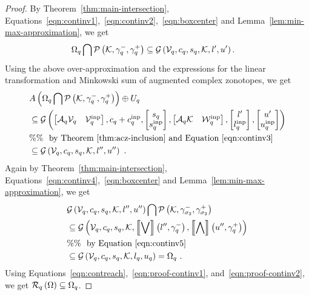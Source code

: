 \begin{proof}
By Theorem~\ref{thm:main-intersection},
Equations~\ref{eqn:continv1},~\ref{eqn:continv2},~\ref{eqn:boxcenter}
and Lemma~\ref{lem:min-max-approximation}, we get
%
\begin{align*}
& \Omega_q\bigcap{\mathcal{P}\left(\mathcal{K},\gamma_q^-,\gamma_q^+\right)}
  \subseteq \mathcal{G}\left(\mathcal{V}_q,c_q,s_q,\mathcal{K},l^\prime,u^\prime\right).
\end{align*}
%
Using the above over-approximation and the expressions for the linear
transformation and Minkowski sum of augmented complex zonotopes, we
get
%
\begin{align}
& A\left(\Omega_q\bigcap{\mathcal{P}\left(\mathcal{K},\gamma_q^-,\gamma_q^+\right)}\right)\oplus U_q\nonumber\\
& \subseteq \mathcal{G}\left(
\left[\begin{matrix}\mathcal{A}_q\mathcal{V}_q & \mathcal{V}^{\operatorname{inp}}_q\end{matrix}\right]
,
c_q+c^{\operatorname{inp}}_q
,
\left[\begin{matrix}s_q\\ s^{\operatorname{inp}}_q\end{matrix}\right]
,
\left[\begin{matrix}\mathcal{A}_q\mathcal{K} & \mathcal{W}^{\operatorname{inp}}_q\end{matrix}\right]
,
\left[\begin{matrix}l^\prime\\l^{\operatorname{inp}}_q\end{matrix}\right]
,
\left[\begin{matrix}u^\prime\\ u^{\operatorname{inp}}_q\end{matrix}\right]
\right)\nonumber\\
& \%\%~~\text{by Theorem~\ref{thm:acz-inclusion} and Equation~\ref{eqn:continv3}}\nonumber\\
& \subseteq \mathcal{G}\left(\mathcal{V}_q,c_q,s_q,\mathcal{K},l^{\prime\prime},u^{\prime\prime}\right)~\label{eqn:proof-continv1}.
\end{align}
%
Again by Theorem~\ref{thm:main-intersection},
Equations~\ref{eqn:continv4},~\ref{eqn:boxcenter}
and Lemma~\ref{lem:min-max-approximation}, we
get
%
\begin{align}
& \mathcal{G}\left(\mathcal{V}_q,c_q,s_q,\mathcal{K},l^{\prime\prime},u^{\prime\prime}\right)\bigcap\mathcal{P}\left(\mathcal{K},\gamma_{\sigma_2}^-,\gamma_{\sigma_2}^+\right)\nonumber\\
& \subseteq \mathcal{G}\left(\mathcal{V}_q,c_q,s_q,\mathcal{K},\left\llbracket\bigvee\right\rrbracket\left(l^{\prime\prime},\gamma_q^-\right),\left\llbracket\bigwedge\right\rrbracket\left(u^{\prime\prime},\gamma_q^+\right)\right)\nonumber\\
& \%\%~~\text{by Equation~\ref{eqn:continv5}}\nonumber\\
& \subseteq \mathcal{G}\left(\mathcal{V}_q,c_q,s_q,\mathcal{K},l_q,u_q\right)=\Omega_q~\label{eqn:proof-continv2}.
\end{align}
%
Using Equations~\ref{eqn:contreach},~\ref{eqn:proof-continv1},
and~\ref{eqn:proof-continv2}, we get
$\mathcal{R}_{q}\left(\Omega\right)\subseteq \Omega_q$.
\end{proof}
